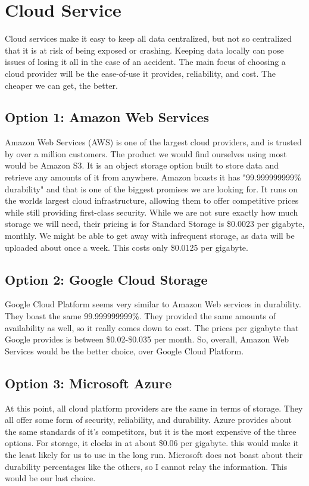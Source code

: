 \section{Cloud Service}
    Cloud services make it easy to keep all data centralized, but not so centralized that it is at risk of being exposed or crashing. Keeping data locally can pose issues of losing it all in the case of an accident. The main focus of choosing a cloud provider will be the ease-of-use it provides, reliability, and cost. The cheaper we can get, the better. 
    
    \subsection{Option 1: Amazon Web Services}
        Amazon Web Services (AWS) is one of the largest cloud providers, and is trusted by over a million customers. The product we would find ourselves using most would be Amazon S3. It is an object storage option built to store data and retrieve any amounts of it from anywhere. Amazon boasts it has "99.999999999\% durability" \cite{aws} and that is one of the biggest promises we are looking for. It runs on the worlds largest cloud infrastructure, allowing them to offer competitive prices while still providing first-class security. While we are not sure exactly how much storage we will need, their pricing is for Standard Storage is \$0.0023 per gigabyte, monthly. We might be able to get away with infrequent storage, as data will be uploaded about once a week. This costs only \$0.0125 per gigabyte. 
        
    \subsection{Option 2: Google Cloud Storage}
        Google Cloud Platform seems very similar to Amazon Web services in durability. They boast the same 99.999999999\%. \cite{google} They provided the same amounts of availability as well, so it really comes down to cost. The prices per gigabyte that Google provides is between \$0.02-\$0.035 per month. So, overall, Amazon Web Services would be the better choice, over Google Cloud Platform.
        
    \subsection{Option 3: Microsoft Azure}
        At this point, all cloud platform providers are the same in terms of storage. They all offer some form of security, reliability, and durability. Azure provides about the same standards of it's competitors, but it is the most expensive of the three options. For storage, it clocks in at about \$0.06 per gigabyte. this would make it the least likely for us to use in the long run. Microsoft does not boast about their durability percentages like the others, so I cannot relay the information. This would be our last choice.
        
